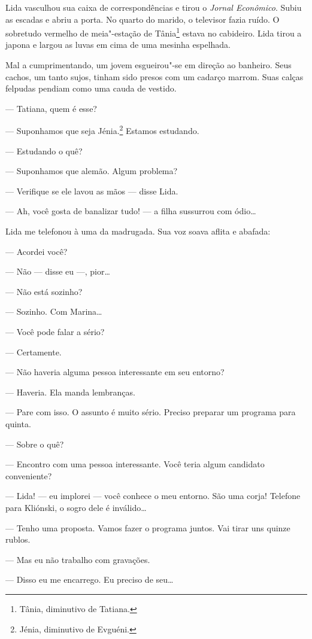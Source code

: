 Lida vasculhou sua caixa de correspondências e tirou o \emph{Jornal Econômico}. Subiu
as escadas e abriu a porta. No quarto do marido, o televisor fazia
ruído. O sobretudo vermelho de meia"-estação de Tânia\footnote{Tânia,
  diminutivo de Tatiana.} estava no cabideiro. Lida tirou a japona e
largou as luvas em cima de uma mesinha espelhada.

Mal a cumprimentando, um jovem esgueirou"-se em direção ao banheiro. Seus
cachos, um tanto sujos, tinham sido presos com um cadarço marrom. Suas calças felpudas pendiam como uma cauda de vestido.

--- Tatiana, quem é esse?

--- Suponhamos que seja Jénia.\footnote{Jénia, diminutivo de Evguéni.}
Estamos estudando.

--- Estudando o quê?

--- Suponhamos que alemão. Algum problema?

--- Verifique se ele lavou as mãos --- disse Lida.

--- Ah, você gosta de banalizar tudo! --- a filha sussurrou com ódio\ldots{}

Lida me telefonou à uma da madrugada. Sua voz soava aflita e abafada:

--- Acordei você?

--- Não --- disse eu ---, pior\ldots{}

--- Não está sozinho?

--- Sozinho. Com Marina\ldots{}

--- Você pode falar a sério?

--- Certamente.

--- Não haveria alguma pessoa interessante em seu entorno?

--- Haveria. Ela manda lembranças.

--- Pare com isso. O assunto é muito sério. Preciso preparar um programa
para quinta.

--- Sobre o quê?

--- Encontro com uma pessoa interessante. Você teria algum candidato
conveniente?

--- Lida! --- eu implorei --- você conhece o meu entorno. São uma corja!
Telefone para Kliónski, o sogro dele é inválido\ldots{}

--- Tenho uma proposta. Vamos fazer o programa juntos. Vai tirar uns
quinze rublos.

--- Mas eu não trabalho com gravações.

--- Disso eu me encarrego. Eu preciso de seu\ldots{}

